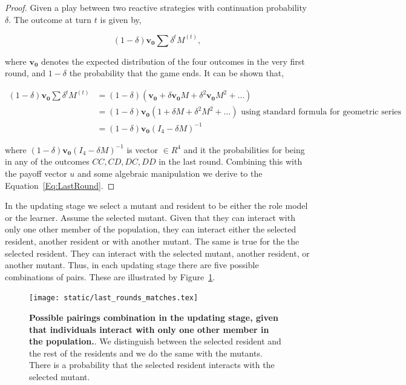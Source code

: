 \documentclass[11pt]{article}
\theoremstyle{plainCl1}
\theoremstyle{plainCl2}
\begin{document}
\begin{proof}
Given a play between two reactive strategies with continuation probability
$\delta$. The outcome at turn \(t\) is given by,

\begin{equation}\label{eq:}
  (1 - \delta) \mathbf{v_0} \sum \delta^{t} M^{(t)},
\end{equation}

where $\mathbf{v_0}$ denotes the expected distribution of the four outcomes in
the very first round, and \(1- \delta\) the probability that the game ends.
It can be shown that,

\begin{align*}
  (1 - \delta) \mathbf{v_0} \sum \delta^{t} M^{(t)} & = (1 - \delta)(\mathbf{v_0} + \delta \mathbf{v_0} M + \delta^{2}\mathbf{v_0} M ^{2} + \dots )\\ 
   & = (1 - \delta)\mathbf{v_0} (1 + \delta M + \delta^{2}M ^{2} + \dots ) \text{ using standard formula for geometric series}\\ 
   & = (1 - \delta)\mathbf{v_0}(I_4 - \delta M)^{-1}
\end{align*}

where \((1 - \delta)\mathbf{v_0}(I_4 - \delta M)^{-1}\) is vector \(\in R^{4}\)
and it the probabilities for being in any of the outcomes \(CC, CD, DC, DD\) in
the last round. Combining this with the payoff vector \(u\) and some algebraic
manipulation we derive to the Equation~\ref{Eq:LastRound}.
\end{proof}

In the updating stage we select a mutant and resident to be either the role
model or the learner. Assume the selected mutant. Given that they can interact
with only one other member of the population, they can interact either the
selected resident, another resident or with another mutant. The same is true for
the the selected resident. They can interact with the selected mutant, another
resident, or another mutant. Thus, in each updating stage there are five
possible combinations of pairs. These are illustrated by
Figure~\ref{fig:single_pairs}.

\begin{figure}[!htbp]
  \centering
  \texttt{[image: static/last\_rounds\_matches.tex]}
  \caption{\textbf{Possible pairings combination in the updating stage, given
  that individuals interact with only one other member in the population.}. We
  distinguish between the selected resident and the rest of the residents and we
  do the same with the mutants. There is a probability that the selected
  resident interacts with the selected mutant.}\label{fig:single_pairs}
\end{figure}
\end{document}

